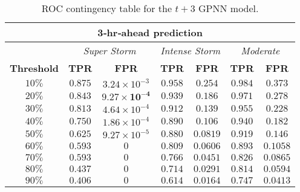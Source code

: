 \begin{table}[h]
	\centering
	\caption{ROC contingency table for the $t+3$ GPNN model.}
	\label{table:rocgpnn3h}
	\begin{tabular}
		{c| c c | c c | c c}
		\hline
		\multicolumn{7}{c}{\textbf{3‐hr‐ahead prediction}} \\ 
		\hline
		 & \multicolumn{2}{c}{\textit{Super Storm}} & \multicolumn{2}{c}{\textit{Intense Storm}} & \multicolumn{2}{c}{\textit{Moderate}} \\ 
		\hline
		\textbf{Threshold} & \textbf{TPR} & \textbf{FPR} & \textbf{TPR} & \textbf{FPR} & \textbf{TPR} & \textbf{FPR} \\ 
		\hline
		$10\%$ & $0.875$ & $3.24\times10^{-3}$ & $0.958$ & $0.254$ & $0.984$ & $0.373$ \\ 
		$20\%$ & $\mathbf{0.843}$ & $\mathbf{9.27\times10^{-4}}$ & $0.939$ & $0.186$ & $0.971$ & $0.278$ \\ 
		$30\%$ & $0.813$ & $4.64\times10^{-4}$ & $0.912$ & $0.139$ & $0.955$ & $0.228$ \\ 
		$40\%$ & $0.750$ & $1.86\times10^{-4}$ & $\mathbf{0.890}$ & $\mathbf{0.106}$ & $0.940$ & $0.182$ \\ 
		$50\%$ & $0.625$ & $9.27\times10^{-5}$ & $0.880$ & $0.0819$ & $0.919$ & $0.146$ \\ 
		$60\%$ & $0.593$ & $0$ & $0.809$ & $0.0606$ & $\mathbf{0.893}$ & $\mathbf{0.1058}$ \\ 
		$70\%$ & $0.593$ & $0$ & $0.766$ & $0.0451$ & $0.826$ & $0.0865$ \\ 
		$80\%$ & $0.437$ & $0$ & $0.714$ & $0.0291$ & $0.814$ & $0.0594$ \\ 
		$90\%$ & $0.406$ & $0$ & $0.614$ & $0.0164$ & $0.747$ & $0.0413$\\
		\hline
	\end{tabular}
\end{table}


